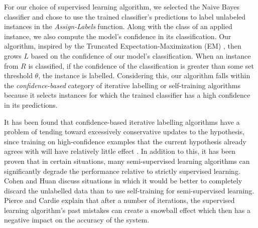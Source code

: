 \documentclass[10pt,letterpaper]{article}
\begin{document}
For our choice of supervised learning algorithm, we selected the Naive Bayes classifier and chose to use the trained classifier’s predictions to label unlabeled instances in the \textit{Assign-Labels} function. Along with the class of an applied instance, we also compute the model's confidence in its classification. Our algorithm, inspired by the Truncated Expectation-Maximization (EM) \cite{REF21}, then grows $L$ based on the confidence of our model's classification. When an instance from $R$ is classified, if the confidence of the classification is greater than some set threshold $\theta$, the instance is labelled. Considering this, our algorithm falls within the \textit{confidence-based} category of iterative labelling  or self-training algorithms because it selects instances for which the trained classifier has a high confidence in its predictions. 

It has been found that confidence-based iterative labelling algorithms have a problem of tending toward excessively conservative updates to the hypothesis, since training on high-confidence examples that the current hypothesis already agrees with will have relatively little effect \cite{REF21}. In addition to this, it has been proven that in certain situations, many semi-supervised learning algorithms can significantly degrade the performance relative to strictly supervised learning. Cohen and Huan \cite{REF23} discuss situations in which it would be better to completely discard the unlabelled data than to use self-training for semi-supervised learning. Pierce and Cardie \cite{REF24} explain that after a number of iterations, the supervised learning algorithm's past mistakes can create a snowball effect which then has a negative impact on the accuracy of the system. 
\end{document}
